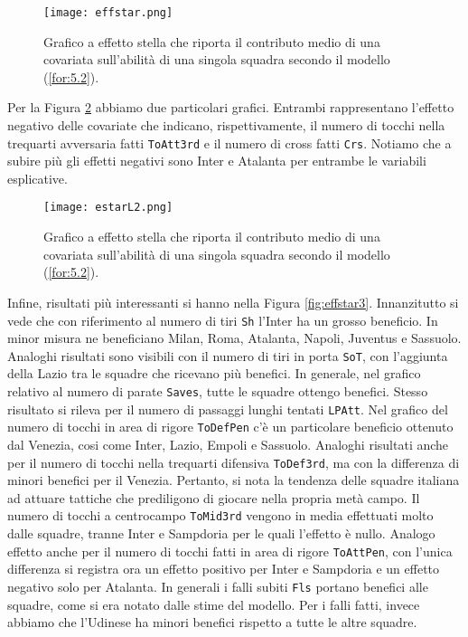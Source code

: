 \begin{figure}[htbp]
	\begin{center}
		\texttt{[image: effstar.png]}
		\caption{Grafico a effetto stella che riporta il contributo medio di una covariata sull'abilità di una singola squadra secondo il modello (\ref{for:5.2}).} \label{fig:effstar1}
	\end{center}
\end{figure}

Per la Figura \ref{fig:effstar2} abbiamo due particolari grafici. Entrambi rappresentano l'effetto negativo delle covariate che indicano, rispettivamente, il numero di tocchi nella trequarti avversaria fatti \texttt{ToAtt3rd} e il numero di cross fatti \texttt{Crs}. Notiamo che a subire più gli effetti negativi sono Inter e Atalanta per entrambe le variabili esplicative. 
\begin{figure}[htbp]
	\begin{center}
		\texttt{[image: estarL2.png]}
		\caption{Grafico a effetto stella che riporta il contributo medio di una covariata sull'abilità di una singola squadra secondo il modello (\ref{for:5.2}).} \label{fig:effstar2}
	\end{center}
\end{figure}
Infine, risultati più interessanti si hanno nella Figura \ref{fig:effstar3}. Innanzitutto si vede che con riferimento al numero di tiri \texttt{Sh} l'Inter ha un grosso beneficio. In minor misura ne beneficiano Milan, Roma, Atalanta, Napoli, Juventus e Sassuolo. Analoghi risultati sono visibili con il numero di tiri in porta \texttt{SoT}, con l'aggiunta della Lazio tra le squadre che ricevano più benefici. In generale, nel grafico relativo al numero di parate \texttt{Saves}, tutte le squadre ottengo benefici. Stesso risultato si rileva per il numero di passaggi lunghi tentati \texttt{LPAtt}. Nel grafico del numero di tocchi in area di rigore \texttt{ToDefPen} c'è un particolare beneficio ottenuto dal Venezia, cosi come Inter, Lazio, Empoli e Sassuolo. Analoghi risultati anche per il numero di tocchi nella trequarti difensiva \texttt{ToDef3rd}, ma con la differenza di minori benefici per il Venezia. Pertanto, si nota la tendenza delle squadre italiana ad attuare tattiche che prediligono di giocare nella propria metà campo. Il numero di tocchi a centrocampo \texttt{ToMid3rd} vengono in media effettuati molto dalle squadre, tranne Inter e Sampdoria per le quali l'effetto è nullo. Analogo effetto anche per il numero di tocchi fatti in area di rigore \texttt{ToAttPen}, con l'unica differenza si registra ora un effetto positivo per Inter e Sampdoria e un effetto negativo solo per Atalanta. In generali i falli subiti \texttt{Fls} portano benefici alle squadre, come si era notato dalle stime del modello. Per i falli fatti, invece abbiamo che l'Udinese ha minori benefici rispetto a tutte le altre squadre. \\
